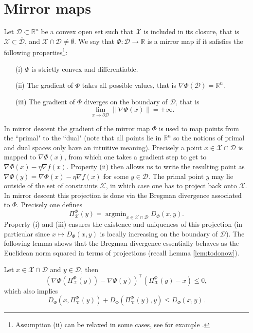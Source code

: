 \documentclass[openany]{now}
\newcommand{\R}{\mathbb{R}}
\newcommand{\cX}{\mathcal{X}}
\newcommand{\cD}{\mathcal{D}}
\newcommand{\argmin}{\mathop{\mathrm{argmin}}}
\begin{document}
\section{Mirror maps} \label{sec:mm}
Let $\cD \subset \R^n$ be a convex open set such that $\mathcal{X}$ is included in its closure, that is $\mathcal{X} \subset \overline{\mathcal{D}}$, and $\mathcal{X} \cap \mathcal{D} \neq \emptyset$. We say that $\Phi : \cD \rightarrow \R$ is a mirror map if it safisfies the following properties\footnote{Assumption (ii) can be relaxed in some cases, see for example \cite{ABL14}.}:
\begin{enumerate}
\item[(i)] $\Phi$ is strictly convex and differentiable.
\item[(ii)] The gradient of $\Phi$ takes all possible values, that is $\nabla \Phi(\cD) = \R^n$.
\item[(iii)] The gradient of $\Phi$ diverges on the boundary of $\cD$, that is 
$$\lim_{x \rightarrow \partial \mathcal{D}} \|\nabla \Phi(x)\| = + \infty .$$
\end{enumerate}

In mirror descent the gradient of the mirror map $\Phi$ is used to map points from the ``primal" to the ``dual" (note that all points lie in $\R^n$ so the notions of primal and dual spaces only have an intuitive meaning). Precisely a point $x \in \mathcal{X} \cap \mathcal{D}$ is mapped to $\nabla \Phi(x)$, from which one takes a gradient step to get to $\nabla \Phi(x) - \eta \nabla f(x)$. Property (ii) then allows us to write the resulting point as $\nabla \Phi(y) = \nabla \Phi(x) - \eta \nabla f(x)$ for some $y \in \cD$. The primal point $y$ may lie outside of the set of constraints $\cX$, in which case one has to project back onto $\cX$. In mirror descent this projection is done via the Bregman divergence associated to $\Phi$. Precisely one defines
$$\Pi_{\cX}^{\Phi} (y) = \argmin_{x \in \mathcal{X} \cap \mathcal{D}} D_{\Phi}(x,y) .$$
Property (i) and (iii) ensures the existence and uniqueness of this projection (in particular since $x \mapsto D_{\Phi}(x,y)$ is locally increasing on the boundary of $\mathcal{D}$). The following lemma shows that the Bregman divergence essentially behaves as the Euclidean norm squared in terms of projections (recall Lemma \ref{lem:todonow}).

\begin{lemma} \label{lem:todonow2}
Let $x \in \cX \cap \cD$ and $y \in \cD$, then
$$(\nabla \Phi(\Pi_{\cX}^{\Phi}(y)) - \nabla \Phi(y))^{\top} (\Pi^{\Phi}_{\cX}(y) - x) \leq 0 ,$$
which also implies 
$$D_{\Phi}(x, \Pi^{\Phi}_{\cX}(y)) + D_{\Phi}(\Pi^{\Phi}_{\cX}(y), y) \leq D_{\Phi}(x,y) .$$
\end{lemma}
\end{document}
